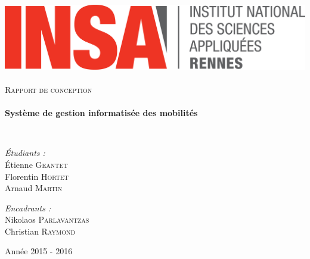 \begin{titlepage}
        \begin{sffamily}
            \begin{center}

                \includegraphics[width=400pt]{logo_INSA.png}~\\[2.5cm]

                \textsc{\huge Rapport de conception}\\[2.5cm]

                \HRule \\[0.4cm]
                { \huge \bfseries Système de gestion informatisée des mobilités\\[0.4cm] }

                \HRule \\[4cm]

                \begin{minipage}{0.4\textwidth}
                    \begin{flushleft} \large
                        \emph{Étudiants :}\\
                        Étienne \textsc{Geantet}\\
                        Florentin \textsc{Hortet}\\
                        Arnaud \textsc{Martin}\\
                    \end{flushleft}
                \end{minipage}
                \begin{minipage}{0.5\textwidth}
                    \begin{flushright} \large
                        \emph{Encadrants :} \\
                        Nikolaos \textsc{Parlavantzas}\\
                        Christian \textsc{Raymond}
                    \end{flushright}
                \end{minipage}

                \vfill

                {\large Année 2015 - 2016}

            \end{center}
        \end{sffamily}
    \end{titlepage}
